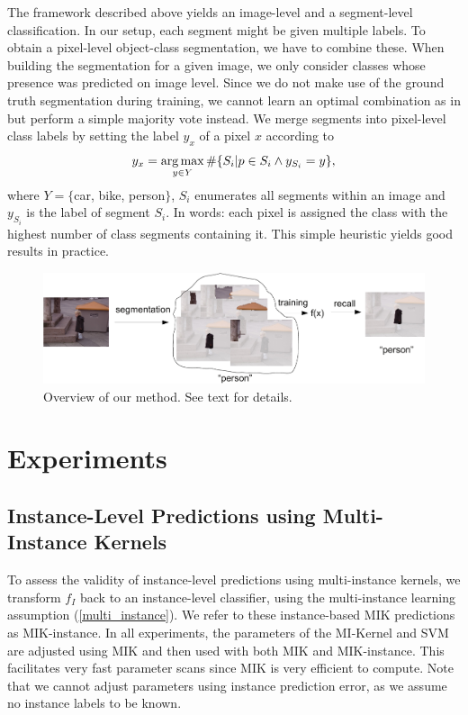 The framework described above yields an image-level and a segment-level
classification.  In our setup, each segment might be given multiple labels.
To obtain a pixel-level object-class segmentation, we have to combine these.
When building the segmentation for a given image, we only consider classes
whose presence was predicted on image level.  Since we do not make use of the
ground truth segmentation during training, we cannot learn an optimal
combination as in \citet{li2010object} but perform a simple majority vote
instead.  We merge segments into pixel-level class labels by setting the label
$y_x$ of a pixel $x$ according to
\begin{equation}
    y_x = \operatorname*{arg\,max}_{y \in Y} \#\{S_i | p \in S_i \land y_{S_i}=y \},
\end{equation}
where $Y= \{$car, bike, person$ \}$, $S_i$ enumerates all segments within an
image and $y_{S_i}$ is the label of segment $S_i$. In words: each pixel is
assigned the class with the highest number of class segments containing it.
This simple heuristic yields good results in practice.

\begin{figure}[tbp]
	\begin{center}
        \includegraphics[width=\linewidth]{images/scheme-crop.pdf}
	\end{center}
        \caption{Overview of our method. See text for details.}
\end{figure}

\section{Experiments}

\subsection{Instance-Level Predictions using Multi-Instance Kernels}

To assess the validity of instance-level predictions using multi-instance
kernels, we transform $f_{I}$ back to an instance-level classifier, using the
multi-instance learning assumption (\eqref{multi_instance}). We refer to these
instance-based MIK predictions as MIK-instance. In all experiments, the
parameters of the MI-Kernel and SVM are adjusted using MIK and then used with
both MIK and MIK-instance.  This facilitates very fast parameter scans since
MIK is very efficient to compute. Note that we cannot adjust parameters using
instance prediction error, as we assume no instance labels to be known.

